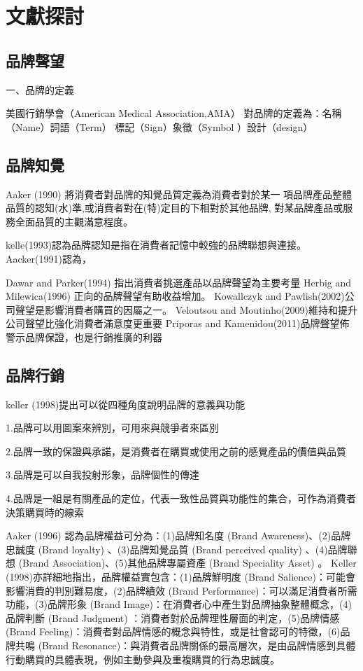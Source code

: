 \chapter{文獻探討}


\section{品牌聲望}

一、品牌的定義

美國行銷學會（American Medical Association,AMA）
對品牌的定義為：名稱 （Name）詞語（Term） 標記（Sign）象徵（Symbol ）設計（design）


\section{品牌知覺}
Aaker (1990) 將消費者對品牌的知覺品質定義為消費者對於某一 項品牌產品整體品質的認知(水)準,或消費者對在(特)定目的下相對於其他品牌, 對某品牌產品或服務全面品質的主觀滿意程度。

kelle(1993)認為品牌認知是指在消費者記憶中較強的品牌聯想與連接。Aacker(1991)認為，

Dawar and Parker(1994) 指出消費者挑選產品以品牌聲望為主要考量
Herbig and Milewica(1996) 正向的品牌聲望有助收益增加。
Kowallczyk and Pawlish(2002)公司聲望是影響消費者購買的因屬之一。
Veloutsou and Moutinho(2009)維持和提升公司聲望比強化消費者滿意度更重要
Priporas and Kamenidou(2011)品牌聲望佈警示品牌保證，也是行銷推廣的利器
\section{品牌行銷}

keller (1998)提出可以從四種角度說明品牌的意義與功能\cite{Aaker}

1.品牌可以用圖案來辨別，可用來與競爭者來區別

2.品牌一致的保證與承諾，是消費者在購買或使用之前的感覺產品的價值與品質

3.品牌是可以自我投射形象，品牌個性的傳達

4.品牌是一組是有關產品的定位，代表一致性品質與功能性的集合，可作為消費者決策購買時的線索

Aaker (1996) 認為品牌權益可分為：(1)品牌知名度 (Brand Awareness)、(2)品牌忠誠度 (Brand loyalty) 、(3)品牌知覺品質 (Brand perceived quality) 、(4)品牌聯想 (Brand Association)、(5)其他品牌專屬資產 (Brand Speciality Asset) 。
    Keller (1998)亦詳細地指出，品牌權益實包含：(1)品牌鮮明度 (Brand Salience)：可能會影響消費的判別難易度，(2)品牌績效 (Brand Performance)：可以滿足消費者所需功能，(3)品牌形象 (Brand Image)：在消費者心中產生對品牌抽象整體概念，(4)品牌判斷 (Brand Judgment) ：消費者對於品牌理性層面的判定，(5)品牌情感 (Brand Feeling)：消費者對品牌情感的概念與特性，或是社會認可的特徵，(6)品牌共鳴 (Brand Resonance)：與消費者品牌關係的最高層次，是由品牌情感到具體行動購買的具體表現，例如主動參與及重複購買的行為忠誠度。

